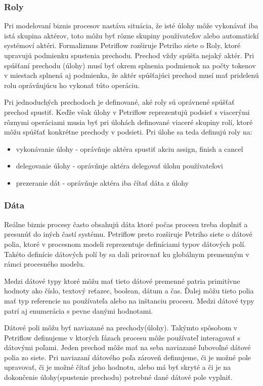 \subsubsection{Roly}
Pri modelovaní biznis procesov nastáva situácia, že isté úlohy môže vykonávať iba istá skupina aktérov, toto môžu byť rôzne skupiny používateľov alebo automatickí systémoví aktéri.  Formalizmus Petriflow rozširuje Petriho siete o Roly, ktoré upravujú podmienku spustenia prechodu. Prechod vždy spúšťa nejaký aktér. Pri spúšťaní prechodu (úlohy) musí byť okrem splnenia podmienok na počty tokenov v miestach splnená aj podmienka, že aktér spúšťajúci prechod musí mať pridelenú rolu oprávňujúcu  ho vykonať túto operáciu. 

Pri jednoduchých prechodoch je definované, aké roly sú oprávnené spúšťať prechod spustiť. Keďže však úlohy v Petriflow reprezentujú podsieť s viacerými rôznymi operáciami musia byť pri úlohách definované viaceré skupiny rolí, ktoré môžu spúšťať konkrétne prechody v podsieti. Pri úlohe sa teda definujú roly na:
\begin{itemize}
\item vykonávanie úlohy - oprávňuje aktéra spustiť akciu assign, finish a cancel
\item delegovanie úlohy - oprávňuje aktéra delegovať úlohu používateľovi
\item prezeranie dát - oprávňuje aktéra  iba čítať dáta z úlohy
\end{itemize}

\subsubsection{Dáta}
Reálne biznis procesy často obsahujú dáta ktoré  počas procesu treba doplniť a presunúť do iných častí systému. Petriflow preto rozširuje Petriho siete o dátové polia, ktoré v procesnom modeli reprezentuje definíciami typov dátových polí. Takéto definície dátových polí by sa dali prirovnať ku globálnym premenným v rámci procesného modelu.  

Medzi dátové typy ktoré môžu  mať tieto dátové premenné patria primitívne hodnoty ako číslo, textový reťazec, boolean, dátum a čas. Ďalej môžu tieto polia mať typ referencie na používateľa alebo na inštanciu procesu. Medzi dátové typy patrí aj enumerácia s pevne danými hodnotami.

Dátové poli môžu byť naviazané na prechody(úlohy). Takýmto spôsobom v Petriflow definujeme v ktorých fázach procesu môže používateľ interagovať s dátovými poľami. Jeden prechod môže mať na seba naviazané ľubovoľné dátové polia zo siete. Pri naviazaní dátového poľa zároveň definujeme, či je možné pole upravovať, či je možné čítať jeho hodnotu, alebo má byť skryté a či je na dokončenie úlohy(spustenie prechodu) potrebné dané dátové pole vyplniť.  

